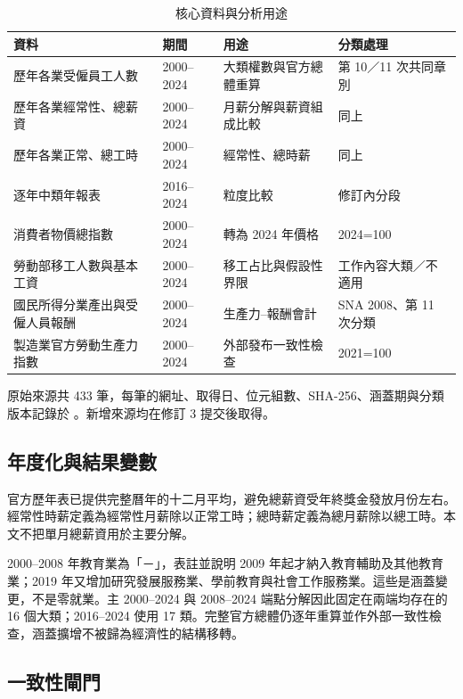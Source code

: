 \documentclass[12pt]{article}
\begin{document}
\begin{table}[htbp]
\caption{核心資料與分析用途}
\centering\small
\begin{tabularx}{\textwidth}{p{3.2cm}p{2.5cm}Xp{2.3cm}}
\toprule
資料 & 期間 & 用途 & 分類處理 \\
\midrule
歷年各業受僱員工人數 & 2000--2024 & 大類權數與官方總體重算 & 第 10／11 次共同章別 \\
歷年各業經常性、總薪資 & 2000--2024 & 月薪分解與薪資組成比較 & 同上 \\
歷年各業正常、總工時 & 2000--2024 & 經常性、總時薪 & 同上 \\
逐年中類年報表 & 2016--2024 & 粒度比較 & 修訂內分段 \\
消費者物價總指數 & 2000--2024 & 轉為 2024 年價格 & 2024=100 \\
勞動部移工人數與基本工資 & 2000--2024 & 移工占比與假設性界限 & 工作內容大類／不適用 \\
國民所得分業產出與受僱人員報酬 & 2000--2024 & 生產力--報酬會計 & SNA 2008、第 11 次分類 \\
製造業官方勞動生產力指數 & 2000--2024 & 外部發布一致性檢查 & 2021=100 \\
\bottomrule
\end{tabularx}
\begin{tabnote}
原始來源共 433 筆，每筆的網址、取得日、位元組數、SHA-256、涵蓋期與分類版本記錄於 。新增來源均在修訂 3 提交後取得。
\end{tabnote}
\end{table}

\subsection{年度化與結果變數}

官方歷年表已提供完整曆年的十二月平均，避免總薪資受年終獎金發放月份左右。經常性時薪定義為經常性月薪除以正常工時；總時薪定義為總月薪除以總工時。本文不把單月總薪資用於主要分解。

2000--2008 年教育業為「－」，表註並說明 2009 年起才納入教育輔助及其他教育業；2019 年又增加研究發展服務業、學前教育與社會工作服務業。這些是涵蓋變更，不是零就業。主 2000--2024 與 2008--2024 端點分解因此固定在兩端均存在的 16 個大類；2016--2024 使用 17 類。完整官方總體仍逐年重算並作外部一致性檢查，涵蓋擴增不被歸為經濟性的結構移轉。

\subsection{一致性閘門}
\end{document}
